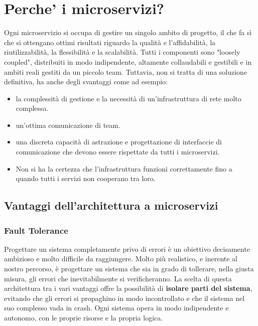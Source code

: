 \section{Perche' i microservizi?}

Ogni microservizio si occupa di gestire un singolo ambito di progetto, il che fa sì che si ottengano ottimi risultati riguardo la qualità e l'affidabilità, la riutilizzabilità, la flessibilità e la scalabilità.
Tutti i componenti sono "loosely coupled", distribuiti in modo indipendente, altamente collaudabili e gestibili e in ambiti reali gestiti da un piccolo team.
Tuttavia, non si tratta di una soluzione definitiva, ha anche degli svantaggi come ad esempio:
\begin{itemize}
    \item la complessità di gestione e la necessità di un'infrastruttura di rete molto complessa.
    \item un'ottima comunicazione di team.
    \item una discreta capacità di astrazione e progettazione di interfaccie di comunicazione che devono essere rispettate da tutti i microservizi.
    \item Non si ha la certezza che l'infrastruttura funzioni correttamente fino a quando tutti i servizi non cooperano tra loro.
\end{itemize}


\subsection{Vantaggi dell'architettura a microservizi}

\subsubsection{Fault Tolerance}

Progettare un sistema completamente privo di errori è un obiettivo decisamente ambizioso e molto difficile da raggiungere. 
Molto più realistico, e inerente al nostro percorso, è progettare un sistema che sia in grado di tollerare, nella giusta misura, gli errori che inevitabilmente si verificheranno. 
La scelta di questa architettura tra i vari vantaggi offre la possibilità di \textbf{isolare parti del sistema}, evitando che gli errori si propaghino in modo incontrollato e che il sistema nel suo complesso vada in crash. 
Ogni sistema opera in modo indipendente e autonomo, con le proprie risorse e la propria logica.
\vspace{1cm}

